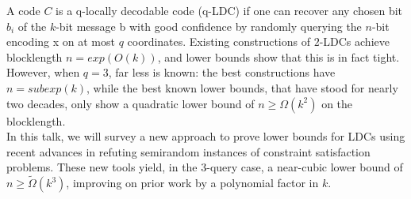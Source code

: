 \documentclass{article}
\begin{document}
A code $C$ is a q-locally decodable code (q-LDC) if one can recover any chosen bit $b_i$ of the $k$-bit message b with good confidence by randomly querying the $n$-bit encoding x on at most $q$ coordinates. Existing constructions of $2$-LDCs achieve blocklength $n = exp(O(k))$, and lower bounds show that this is in fact tight. However, when $q = 3$, far less is known: the best constructions have $n = subexp(k)$, while the best known lower bounds, that have stood for nearly two decades, only show a quadratic lower bound of $n \geq \Omega(k^2)$ on the blocklength.\\

In this talk, we will survey a new approach to prove lower bounds for LDCs using recent advances in refuting semirandom instances of constraint satisfaction problems. These new tools yield, in the $3$-query case, a near-cubic lower bound of $n \geq \tilde{\Omega}(k^3)$, improving on prior work by a polynomial factor in $k$.

\newpage

\end{document}
